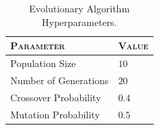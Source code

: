 \begin{table}
    \centering
    \label{tab:ga_hyperparams}
    \begin{tabular}{ll}
        \toprule
        \textsc{Parameter}    & \textsc{Value} \\
        \midrule
        Population Size       & $10$           \\
        Number of Generations & $20$           \\
        Crossover Probability & $0.4$          \\
        Mutation Probability  & $0.5$          \\
        \bottomrule
    \end{tabular}
    \caption{Evolutionary Algorithm Hyperparameters.}
\end{table}
